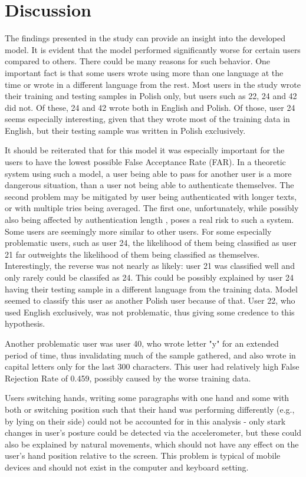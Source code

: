 \section{Discussion}
The findings presented in the study can provide an insight into the developed model. It is evident that the model performed significantly worse for certain users compared to others. There could be many reasons for such behavior. One important fact is that some users wrote using more than one language at the time or wrote in a different language from the rest. Most users in the study wrote their training and testing samples in Polish only, but users such as 22, 24 and 42 did not. Of these, 24 and 42 wrote both in English and Polish. Of those, user 24 seems especially interesting, given that they wrote most of the training data in English, but their testing sample was written in Polish exclusively.

It should be reiterated that for this model it was especially important for the users to have the lowest possible False Acceptance Rate (FAR). In a theoretic system using such a model, a user being able to pass for another user is a more dangerous situation, than a user not being able to authenticate themselves. The second problem may be mitigated by user being authenticated with longer texts, or with multiple tries being averaged. The first one, unfortunately, while possibly also being affected by authentication length , poses a real risk to such a system. Some users are seemingly more similar to other users. For some especially problematic users, such as user 24, the likelihood of them being classified as user 21 far outweights the likelihood of them being classified as themselves. Interestingly, the reverse was not nearly as likely: user 21 was classified well and only rarely could be classifed as 24. This could be possibly explained by user 24 having their testing sample in a different language from the training data. Model seemed to classify this user as another Polish user because of that. User 22, who used English exclusively, was not problematic, thus giving some credence to this hypothesis.

Another problematic user was user 40, who wrote letter "y" for an extended period of time, thus invalidating much of the sample gathered, and also wrote in capital letters only for the last 300 characters. This user had relatively high False Rejection Rate of 0.459, possibly caused by the worse training data.

Users switching hands, writing some paragraphs with one hand and some with both or switching position such that their hand was performing differently (e.g., by lying on their side) could not be accounted for in this analysis - only stark changes in user's posture could be detected via the accelerometer, but these could also be explained by natural movements, which should not have any effect on the user's hand position relative to the screen. This problem is typical of mobile devices and should not exist in the computer and keyboard setting.

